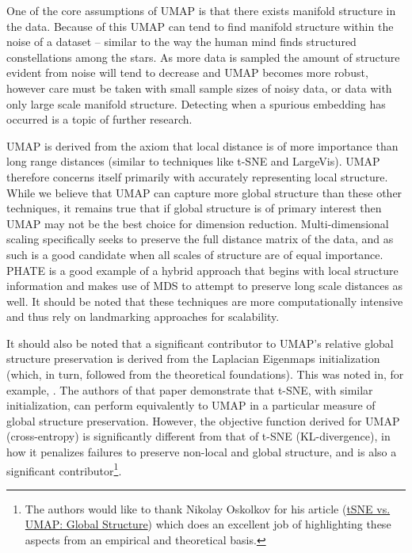 \documentclass[12pt]{article}
\begin{document}
One of the core assumptions of UMAP is that there exists manifold structure in the data. Because of this UMAP can tend to find manifold structure within the noise of a dataset -- similar to the way the human mind finds structured constellations among the stars. As more data is sampled the amount of structure evident from noise will tend to decrease and UMAP becomes more robust, however care must be taken with small sample sizes of noisy data, or data with only large scale manifold structure. Detecting when a spurious embedding has occurred is a topic of further research.

UMAP is derived from the axiom that local distance is of more importance than long range distances (similar to techniques like t-SNE and LargeVis). UMAP therefore concerns itself primarily with accurately representing local structure. While we believe that UMAP can capture more global structure than these other techniques, it remains true that if global structure is of primary interest then UMAP may not be the best choice for dimension reduction. Multi-dimensional scaling specifically seeks to preserve the full distance matrix of the data, and as such is a good candidate when all scales of structure are of equal importance. PHATE {\cite{moon2019visualizing}} is a good example of a hybrid approach that begins with local structure information and makes use of MDS to attempt to preserve long scale distances as well. It should be noted that these techniques are more computationally intensive and thus rely on landmarking approaches for scalability. 

It should also be noted that a significant contributor to UMAP's relative global structure preservation is derived from the Laplacian Eigenmaps initialization (which, in turn, followed from the theoretical foundations). This was noted in, for example, {\cite{kobak2019umap}}. The authors of that paper demonstrate that t-SNE, with similar initialization, can perform equivalently to UMAP in a particular measure of global structure preservation. However, the objective function derived for UMAP (cross-entropy) is significantly different from that of t-SNE (KL-divergence), in how it penalizes failures to preserve non-local and global structure, and is also a significant contributor\footnote{The authors would like to thank Nikolay Oskolkov for his article  (\href{https://towardsdatascience.com/tsne-vs-umap-global-structure-4d8045acba17}{tSNE vs. UMAP: Global Structure}) which does an excellent job of highlighting these aspects from an empirical and theoretical basis.}.
\end{document}
